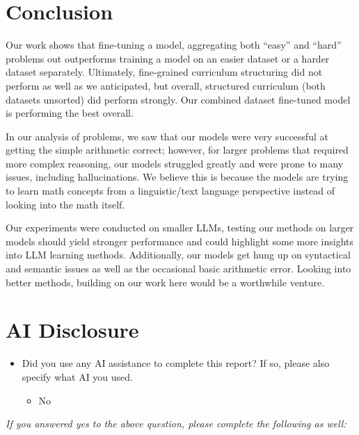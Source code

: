 \section{Conclusion}
Our work shows that fine-tuning a model, aggregating both ``easy'' and ``hard'' problems out outperforms training a model on an easier dataset or a harder dataset separately. Ultimately, fine-grained curriculum structuring did not perform as well as we anticipated, but overall, structured curriculum (both datasets unsorted) did perform strongly. Our combined dataset fine-tuned model is performing the best overall.

In our analysis of problems, we saw that our models were very successful at getting the simple arithmetic correct; however, for larger problems that required more complex reasoning, our models struggled greatly and were prone to many issues, including hallucinations. We believe this is because the models are trying to learn math concepts from a linguistic/text language perspective instead of looking into the math itself. %

Our experiments were conducted on smaller LLMs, testing our methods on larger models should yield stronger performance and could highlight some more insights into LLM learning methods. Additionally, our models get hung up on syntactical and semantic issues as well as the occasional basic arithmetic error. Looking into better methods, building on our work here would be a worthwhile venture. 

\section{AI Disclosure}
\begin{itemize}
    \item Did you use any AI assistance to complete this report? If so, please also specify what AI you used.
    \begin{itemize}
        \item No
    \end{itemize}
\end{itemize}

\noindent\textit{If you answered yes to the above question, please complete the following as well:}

